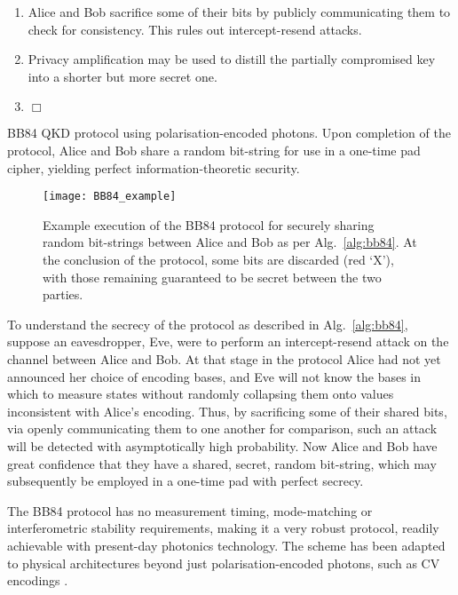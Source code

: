 \begin{table}[!htbp]
\begin{mdframed}[innertopmargin=3pt, innerbottommargin=3pt, nobreak]
{\begin{enumerate}
\item Alice and Bob sacrifice some of their bits by publicly communicating them to check for consistency. This rules out intercept-resend attacks.
\item Privacy amplification may be used to distill the partially compromised key into a shorter but more secret one.
\item $\Box$
\end{enumerate}}
\end{mdframed}
\captionspacealg \caption{BB84 QKD protocol using polarisation-encoded photons. Upon completion of the protocol, Alice and Bob share a random bit-string for use in a one-time pad cipher, yielding perfect information-theoretic security.}\label{alg:bb84}
\end{table}

\begin{figure}[!htbp]
\texttt{[image: BB84\_example]}
\captionspacefig \caption{Example execution of the BB84 protocol for securely sharing random bit-strings between Alice and Bob as per Alg.~\ref{alg:bb84}. At the conclusion of the protocol, some bits are discarded (red `X'), with those remaining guaranteed to be secret between the two parties.} \label{fig:BB84_example}	
\end{figure}

To understand the secrecy of the protocol as described in Alg.~\ref{alg:bb84}, suppose an eavesdropper, Eve, were to perform an intercept-resend attack on the channel between Alice and Bob. At that stage in the protocol Alice had not yet announced her choice of encoding bases, and Eve will not know the bases in which to measure states without randomly collapsing them onto values inconsistent with Alice's encoding. Thus, by sacrificing some of their shared bits, via openly communicating them to one another for comparison, such an attack will be detected with asymptotically high probability. Now Alice and Bob have great confidence that they have a shared, secret, random bit-string, which may subsequently be employed in a one-time pad with perfect secrecy.

The BB84 protocol has no measurement timing, mode-matching or interferometric stability requirements, making it a very robust protocol, readily achievable with present-day photonics technology. The scheme has been adapted to physical architectures beyond just polarisation-encoded photons, such as CV encodings \cite{???}.

